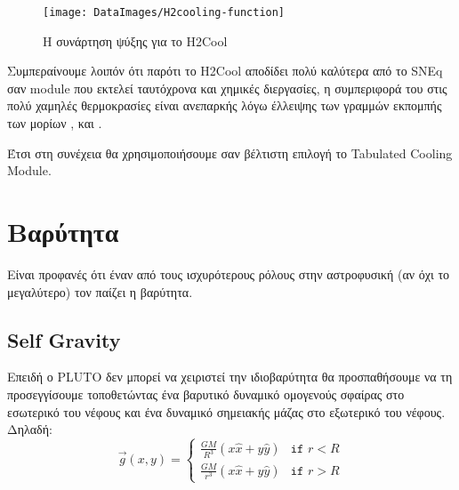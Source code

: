 %
	\begin{figure}[h]
		\centering
		\texttt{[image: DataImages/Η2cooling-function]}
		\caption{H συνάρτηση ψύξης για το H2Cool}
		\label{fig:h2cooling-function}
	\end{figure}
	
%

 Συμπεραίνουμε λοιπόν ότι παρότι το H2Cool αποδίδει πολύ καλύτερα από το SNEq σαν module που εκτελεί ταυτόχρονα και χημικές διεργασίες, η συμπεριφορά του στις πολύ χαμηλές θερμοκρασίες είναι ανεπαρκής λόγω έλλειψης των γραμμών εκπομπής των μορίων ,  και .

 Έτσι στη συνέχεια θα χρησιμοποιήσουμε σαν βέλτιστη επιλογή το Tabulated Cooling Module.






	\newpage
	
	\section{Βαρύτητα}
	Είναι προφανές ότι έναν από τους ισχυρότερους ρόλους στην αστροφυσική (αν όχι το μεγαλύτερο) τον παίζει η βαρύτητα. 
	
	\subsection{Self Gravity}
	\label{par:SolidSphereSelfGravit}
	Επειδή ο PLUTO δεν μπορεί να χειριστεί την ιδιοβαρύτητα θα προσπαθήσουμε να τη προσεγγίσουμε τοποθετώντας ένα βαρυτικό δυναμικό ομογενούς σφαίρας στο εσωτερικό του νέφους και ένα δυναμικό σημειακής μάζας στο εξωτερικό του νέφους. Δηλαδή:
	\begin{equation}
		\vec{g}(x,y) = 
		\begin{cases}
			\frac{GM}{R^3}(x \hat{x}+ y \hat{y}) &\texttt{if } r<R \\
			\frac{GM}{r^3}(x \hat{x}+ y \hat{y}) &\texttt{if } r>R
		\end{cases}
	\end{equation}
	

